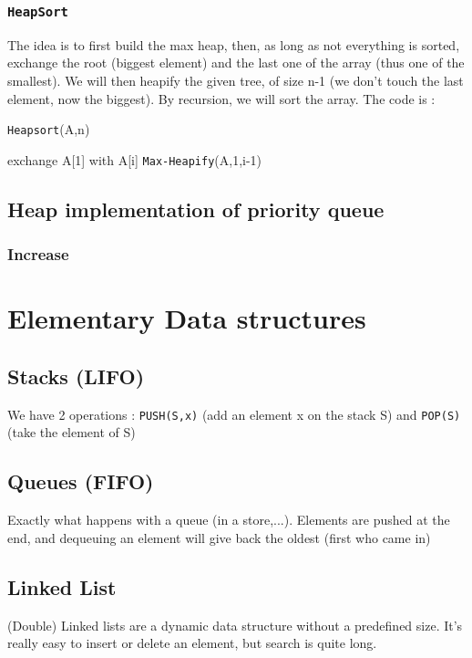 \documentclass[12pt,twoside,a4paper]{article}
\begin{document}
\subsubsection{\texttt{HeapSort}}
The idea is to first build the max heap, then, as long as not everything is sorted, exchange the root (biggest element) and the last one of the array (thus one of the smallest). We will then heapify the given tree, of size n-1 (we don't touch the last element, now the biggest). By recursion, we will sort the array. The code is :
\begin{algorithm}
	\caption{\texttt{Heapsort}(A,n)}
	\begin{algorithmic}
			\STATE exchange A[1] with A[i]
			\STATE \texttt{Max-Heapify}(A,1,i-1)
		\ENDFOR
	\end{algorithmic}
\end{algorithm}
			
	

\subsection{Heap implementation of priority queue}
\subsubsection{Increase }

\section{Elementary Data structures}
\subsection{Stacks (LIFO)}
We have 2 operations : \texttt{PUSH(S,x)} (add an element x on the stack S) and \texttt{POP(S)} (take the element of S)

\subsection{Queues (FIFO)}
Exactly what happens with a queue (in a store,...). Elements are pushed at the end, and dequeuing an element will give back the oldest (first who came in)
\subsection{Linked List}
(Double) Linked lists are a dynamic data structure without a predefined size. It's really easy to insert or delete an element, but search is quite long. 
\end{document}
